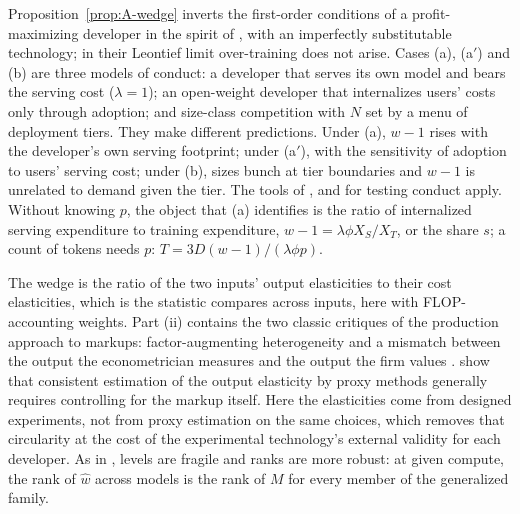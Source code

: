 \begin{remark}\label{rem:A-conduct}
Proposition~\ref{prop:A-wedge} inverts the first-order conditions of a profit-maximizing developer in the spirit of
\citet{hao2026theory}, with an imperfectly substitutable technology; in their Leontief limit over-training does not arise.
Cases (a), (a$'$) and (b) are three models of conduct: a developer that serves its own model and bears the serving cost
($\lambda=1$); an open-weight developer that internalizes users' costs only through adoption; and size-class competition
with $N$ set by a menu of deployment tiers. They make different predictions. Under (a), $w-1$ rises with the developer's
own serving footprint; under (a$'$), with the sensitivity of adoption to users' serving cost; under (b), sizes bunch at
tier boundaries and $w-1$ is unrelated to demand given the tier. The tools of \citet{berry2014identification},
\citet{backus2021common} and \citet{duarte2024testing} for testing conduct apply. Without knowing $p$, the object that (a)
identifies is the ratio of internalized serving expenditure to training expenditure, $w-1=\lambda\phi X_S/X_T$, or the
share $s$; a count of tokens needs $p$: $T=3D(w-1)/(\lambda\phi p)$.

The wedge is the ratio of the two inputs' output elasticities to their cost elasticities, which is the statistic
\citet{raval2023testing} compares across inputs, here with FLOP-accounting weights. Part (ii) contains the two classic
critiques of the production approach to markups: factor-augmenting heterogeneity \citep{demirer2020production,raval2023testing}
and a mismatch between the output the econometrician measures and the output the firm values
\citep{bond2020unpleasant}. \citet{doraszelski2021reexamining} show that consistent estimation of the output elasticity by
proxy methods generally requires controlling for the markup itself. Here the elasticities come from designed experiments,
not from proxy estimation on the same choices, which removes that circularity at the cost of the experimental
technology's external validity for each developer. As in \citet{deridder2026hitchhiker}, levels are fragile and ranks are
more robust: at given compute, the rank of $\hat w$ across models is the rank of $M$ for every member of the generalized
family.
\end{remark}

